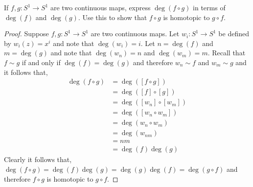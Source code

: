 \documentclass{homework651}
\begin{document}
\begin{problems}
\problem If $f, g: S^1 \to S^1$ are two continuous maps, express $\deg(f \circ g)$
in terms of $\deg(f)$ and $\deg(g)$. Use this to show that $f\circ g$ is homotopic to $g \circ f$.
\begin{proof}Suppose $f, g: S^1 \to S^1$ are two continuous maps. Let $w_i: S^1 \to S^1$ be defined by $w_i(z) = x^i$ and 
    note that $\deg(w_i) = i$. Let $n = \deg(f)$ and $m = \deg(g)$ and note that $\deg(w_n) = n$
    and $\deg(w_m) = m$. Recall that $f \sim g$ if and only if $\deg(f) = \deg(g)$ and therefore $w_n \sim f$ and $w_m \sim g$ and it follows that, 
    \begin{align*}
        \deg(f \circ g) &= \deg([f \circ g])\\ 
        &= \deg([f] \circ [g]) \\
        &= \deg([w_n] \circ [w_m])\\ 
        &= \deg([w_n \circ w_m]) \\
        &= \deg(w_n \circ w_m) \\
        &= \deg(w_{nm}) \\
        &= nm\\
        &= \deg(f)\deg(g)
    \end{align*}
    Clearly it follows that, $\deg(f \circ g) = \deg(f)\deg(g)= \deg(g)\deg(f) = \deg(g \circ f)$ and therefore $f\circ g$ is homotopic to $g \circ f$.
\end{proof}




\end{problems}
\end{document}
